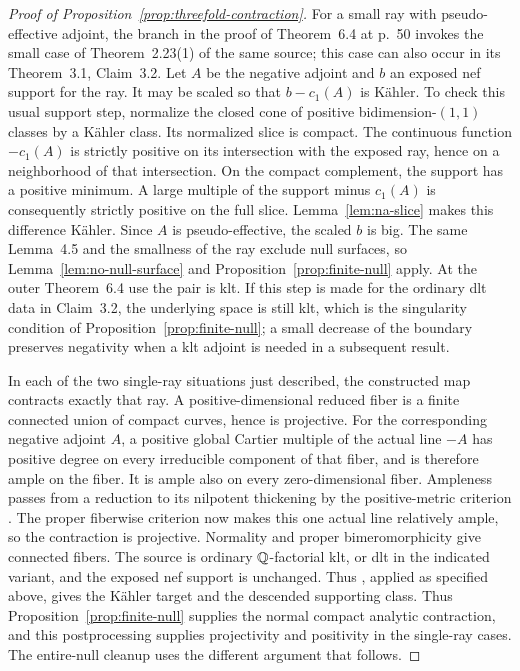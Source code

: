 \begin{proof}[Proof of Proposition~\ref{prop:threefold-contraction}]
For a small ray with pseudo-effective adjoint, the branch in the proof of Theorem~6.4 at
p.~50 invokes the small case of Theorem~2.23(1) of the same source;
this case can also occur in its Theorem~3.1, Claim~3.2.  Let \(A\) be
the negative adjoint and \(b\) an exposed nef support for the ray.
It may be scaled so that \(b-c_1(A)\) is K\"ahler.  To check this
usual support step, normalize the closed cone of positive
bidimension-\((1,1)\) classes by a K\"ahler class.  Its normalized slice
is compact.  The continuous function \(-c_1(A)\) is strictly positive
on its intersection with the exposed ray, hence on a neighborhood of
that intersection.  On the compact complement, the support has a
positive minimum.  A large multiple of the support minus \(c_1(A)\)
is consequently strictly positive on the full slice.
Lemma~\ref{lem:na-slice} makes this difference K\"ahler.  Since
\(A\) is pseudo-effective, the scaled
\(b\) is big.  The same Lemma~4.5 and the smallness of the ray exclude
null surfaces, so Lemma~\ref{lem:no-null-surface} and
Proposition~\ref{prop:finite-null} apply.  At the outer Theorem~6.4
use the pair is klt.  If this step is made for the ordinary dlt data in
Claim~3.2, the underlying space is still klt, which is the singularity
condition of Proposition~\ref{prop:finite-null}; a small decrease of
the boundary preserves negativity when a klt adjoint is needed in a
subsequent result.

In each of the two single-ray situations just described, the constructed
map contracts exactly that ray.  A positive-dimensional reduced fiber
is a finite connected union of compact curves, hence is projective.
For the corresponding negative adjoint \(A\), a positive global Cartier
multiple of the actual line \(-A\) has positive degree on every
irreducible component of that fiber, and is
therefore ample on the fiber.  It is ample also on every zero-dimensional
fiber.  Ampleness passes from a reduction to its nilpotent thickening by
the positive-metric criterion
\cite[Lemma~2.4 and Corollary~1.12]{Fujino2026Fujiki}.  The proper
fiberwise criterion \cite[Definition~3.1 and Remark~3.2]{Fujino2026Fujiki}
now makes this one actual line relatively ample, so the contraction is
projective.  Normality and proper bimeromorphicity give connected fibers.
The source is ordinary \(\mathbb Q\)-factorial klt, or dlt in the indicated
variant, and the exposed nef support is unchanged.  Thus
\cite[Proposition~3.1 and proof of Corollary~3.1]{CampanaHoeringPeternell2016},
applied as specified above, gives the K\"ahler target and the descended
supporting class.
Thus Proposition~\ref{prop:finite-null} supplies the normal compact
analytic contraction, and this postprocessing supplies projectivity and
positivity in the single-ray cases.  The entire-null cleanup uses the
different argument that follows.


\end{proof}
